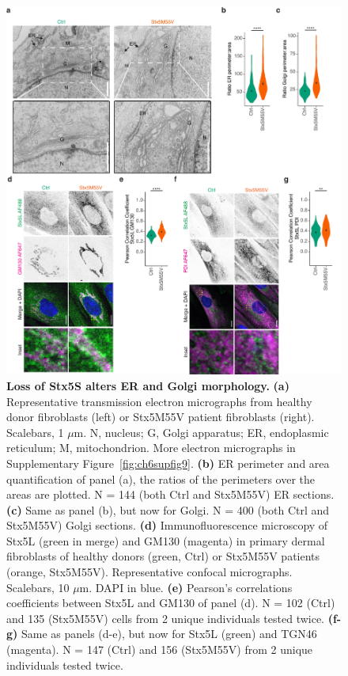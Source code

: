 \begin{figure}
    \includegraphics[keepaspectratio=true,width=\textwidth,height=\textheight]{chapters/chapter6/chapter6_Figure4.pdf}
    \caption{\textbf{Loss of Stx5S alters ER and Golgi morphology.} \textbf{(a)} Representative transmission electron micrographs from healthy donor fibroblasts (left) or Stx5M55V patient fibroblasts (right). Scalebars, 1 $\mu$m. N, nucleus; G, Golgi apparatus; ER, endoplasmic reticulum; M, mitochondrion. More electron micrographs in Supplementary Figure~\ref{fig:ch6supfig9}. \textbf{(b)} ER perimeter and area quantification of panel (a), the ratios of the perimeters over the areas are plotted. N = 144 (both Ctrl and Stx5M55V) ER sections. \textbf{(c)} Same as panel (b), but now for Golgi. N = 400 (both Ctrl and Stx5M55V) Golgi sections. \textbf{(d)} Immunofluorescence microscopy of Stx5L (green in merge) and GM130 (magenta) in primary dermal fibroblasts of healthy donors (green, Ctrl) or Stx5M55V patients (orange, Stx5M55V). Representative confocal micrographs. Scalebars, 10 $\mu$m. DAPI in blue. \textbf{(e)} Pearson's correlations coefficients between Stx5L and GM130 of panel (d). N = 102 (Ctrl) and 135 (Stx5M55V) cells from 2 unique individuals tested twice. \textbf{(f-g)} Same as panels (d-e), but now for Stx5L (green) and TGN46 (magenta). N = 147 (Ctrl) and 156 (Stx5M55V) from 2 unique individuals tested twice.}
    \label{fig:ch6fig4}
\end{figure}

